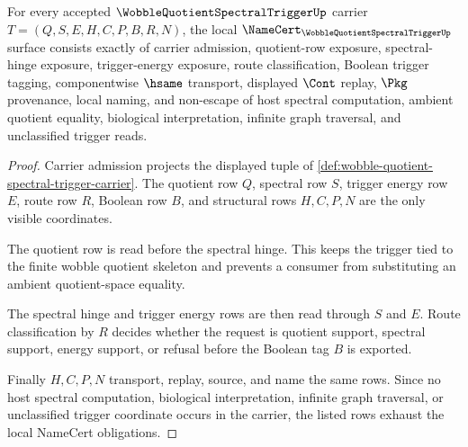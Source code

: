 \begin{theorem}
\label{thm:wobble-quotient-spectral-trigger-namecert-obligations}
For every accepted $\WobbleQuotientSpectralTriggerUp$ carrier $T=(Q,S,E,H,C,P,B,R,N)$, the local $\NameCert_{\WobbleQuotientSpectralTriggerUp}$ surface consists exactly of carrier admission, quotient-row exposure, spectral-hinge exposure, trigger-energy exposure, route classification, Boolean trigger tagging, componentwise $\hsame$ transport, displayed $\Cont$ replay, $\Pkg$ provenance, local naming, and non-escape of host spectral computation, ambient quotient equality, biological interpretation, infinite graph traversal, and unclassified trigger reads.
\end{theorem}
\begin{proof}
Carrier admission projects the displayed tuple of \autoref{def:wobble-quotient-spectral-trigger-carrier}. The quotient row $Q$, spectral row $S$, trigger energy row $E$, route row $R$, Boolean row $B$, and structural rows $H,C,P,N$ are the only visible coordinates.

The quotient row is read before the spectral hinge. This keeps the trigger tied to the finite wobble quotient skeleton and prevents a consumer from substituting an ambient quotient-space equality.

The spectral hinge and trigger energy rows are then read through $S$ and $E$. Route classification by $R$ decides whether the request is quotient support, spectral support, energy support, or refusal before the Boolean tag $B$ is exported.

Finally $H,C,P,N$ transport, replay, source, and name the same rows. Since no host spectral computation, biological interpretation, infinite graph traversal, or unclassified trigger coordinate occurs in the carrier, the listed rows exhaust the local NameCert obligations.
\end{proof}

